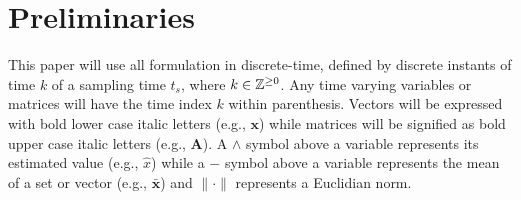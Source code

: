 
\section{Preliminaries} \label{sec:preliminaries}

This paper will use all formulation in discrete-time, defined by discrete instants of time $k$ of a sampling time $t_s$, where $k \in \mathbb{Z}^{\geq0}$. Any time varying variables or matrices will have the time index $k$ within parenthesis. Vectors will be expressed with bold lower case italic letters (e.g., $\bm{x}$) while matrices will be signified as bold upper case italic letters (e.g., $\bm{A}$). A $\wedge$ symbol above a variable represents its estimated value (e.g., $\hat{x}$) while a $-$ symbol above a variable represents the mean of a set or vector (e.g., $\bar{\bm{x}}$) and $\lVert\cdot\rVert$ represents a Euclidian norm.


